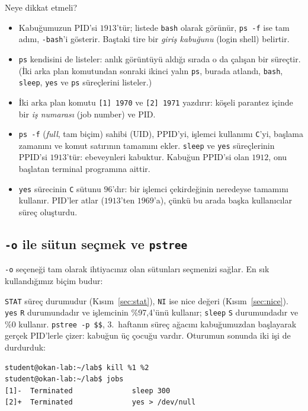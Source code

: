 \documentclass[11pt,a4paper]{article}
\newcommand{\cmd}[1]{\texttt{#1}}
\begin{document}
Neye dikkat etmeli?
\begin{itemize}
  \item Kabuğumuzun PID'si $1913$'tür; listede \texttt{bash} olarak görünür, \cmd{ps -f} ise tam adını, \texttt{-bash}'i gösterir. Baştaki tire bir \emph{giriş kabuğunu} (login shell) belirtir.
  \item \cmd{ps} kendisini de listeler: anlık görüntüyü aldığı sırada o da çalışan bir süreçtir. (İki arka plan komutundan sonraki ikinci yalın \cmd{ps}, burada atlandı, \texttt{bash}, \texttt{sleep}, \texttt{yes} ve \texttt{ps} süreçlerini listeler.)
  \item İki arka plan komutu \texttt{[1] 1970} ve \texttt{[2] 1971} yazdırır: köşeli parantez içinde bir \emph{iş numarası} (job number) ve PID.
  \item \cmd{ps -f} (\emph{full}, tam biçim) sahibi (UID), PPID'yi, işlemci kullanımı \texttt{C}'yi, başlama zamanını ve komut satırının tamamını ekler. \cmd{sleep} ve \cmd{yes} süreçlerinin PPID'si $1913$'tür: ebeveynleri kabuktur. Kabuğun PPID'si olan $1912$, onu başlatan terminal programına aittir.
  \item \cmd{yes} sürecinin \texttt{C} sütunu $96$'dır: bir işlemci çekirdeğinin neredeyse tamamını kullanır. PID'ler atlar ($1913$'ten $1969$'a), çünkü bu arada başka kullanıcılar süreç oluşturdu.
\end{itemize}

\subsection{\texttt{-o} ile sütun seçmek ve \texttt{pstree}}

\cmd{-o} seçeneği tam olarak ihtiyacınız olan sütunları seçmenizi sağlar. En sık kullandığımız biçim budur:



\texttt{STAT} süreç durumudur (Kısım~\ref{sec:stat}), \texttt{NI} ise nice değeri (Kısım~\ref{sec:nice}). \cmd{yes} \texttt{R} durumundadır ve işlemcinin \%97,4'ünü kullanır; \cmd{sleep} \texttt{S} durumundadır ve \%0 kullanır. \cmd{pstree -p \$\$}, 3.~haftanın süreç ağacını kabuğumuzdan başlayarak gerçek PID'lerle çizer: kabuğun üç çocuğu vardır. Oturumun sonunda iki işi de durdurduk:

\begin{lstlisting}[style=wterm]
student@okan-lab:~/lab$ kill %1 %2
student@okan-lab:~/lab$ jobs
[1]-  Terminated              sleep 300
[2]+  Terminated              yes > /dev/null
\end{lstlisting}
\end{document}

